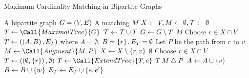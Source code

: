 \begin{algorithm}[!h]
    \caption{Maximum Cardinality Matching in Bipartite Graphs} \label{alg:max_card_match_bipartite}
    \begin{algorithmic}[1]
        \Algin A bipartite graph $G = \left( V, E \right)$
        \Algout A matching $M$ 
        \State $X \gets V, M \gets \emptyset, \mathcal{T} \gets \emptyset$ 
         \label{line:max_card_bi_while}
            \State $T \gets \Call{MaximalTree}{G}$%
            \State $\mathcal{T} \gets \mathcal{T} \cup T$%
            \State $G \gets G \setminus T$ 
        \EndWhile
        \State \Return $M$
        \Statex
            \State Choose $r \in X \cap V$ 
            \State $T \gets \left( \left( A, B \right), E_T \right)$ where $A = \emptyset$, $B = \left\{ r \right\}, E_T = \emptyset$  
                 
                    \State Let $P$ be the path from $r$ to $v$
                    \State $M \gets \Call{Augment}{M, P}$
                    \State $X \gets X \setminus \left\{ r, v \right\}$ 
                        \State \Return $\emptyset$ %
                    \Else 
                        \State Choose $r \in X \cap V$ 
                        \State $T \gets \left( \left( \emptyset, \left\{ r \right\} \right), \emptyset \right)$ 
                    \EndIf
                \Else
                    \State $T \gets \Call{ExtendTree}{T, e}$
                \EndIf
            \EndWhile
            \State \Return $T$ %
        \EndFunction
        \Statex
            \State \Return $ M \bigtriangleup P$
        \EndProcedure
        \Statex
                \State $A \gets A \cup \left\{ v \right\}$
                \State $B \gets B \cup \left\{ w \right\}$    
                \State $E_T \gets E_T \cup \left\{ e, e^\prime \right\}$
            \EndIf
        \EndProcedure
    \end{algorithmic}  
\end{algorithm}

